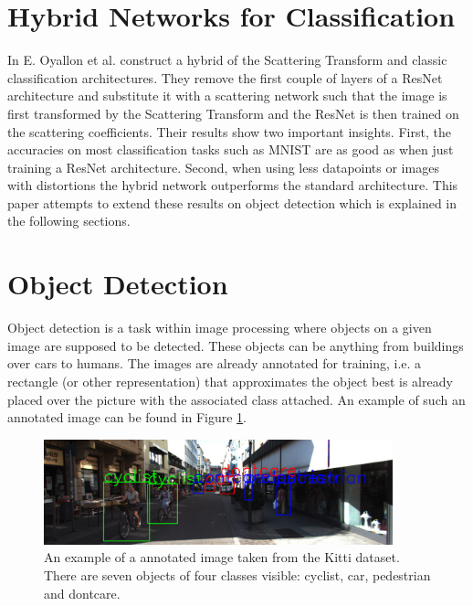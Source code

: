 \section{Hybrid Networks for Classification}
\label{section:hybrid_networks_for_classification}

In \cite{ScalingTheScatteringTransform2017} E. Oyallon et al. construct a hybrid of the Scattering Transform and classic classification architectures. They remove the first couple of layers of a ResNet \cite{ResNet15} architecture and substitute it with a scattering network such that the image is first transformed by the Scattering Transform and the ResNet is then trained on the scattering coefficients. Their results show two important insights. First, the accuracies on most classification tasks such as MNIST are as good as when just training a ResNet architecture. Second, when using less datapoints or images with distortions the hybrid network outperforms the standard architecture. This paper attempts to extend these results on object detection which is explained in the following sections. 

\section{Object Detection}
\label{sec:object_detection}

Object detection is a task within image processing where objects on a given image are supposed to be detected. These objects can be anything from buildings over cars to humans. The images are already annotated for training, i.e. a rectangle (or other representation) that approximates the object best is already placed over the picture with the associated class attached. An example of such an annotated image can be found in Figure \ref{fig:annot_example}.

\begin{figure}[!htb]
	\centering
	\includegraphics[width=0.9\textwidth]{images/Annotations_example.png}
	\caption{An example of a annotated image taken from the Kitti dataset. There are seven objects of four classes visible: cyclist, car, pedestrian and dontcare.}
	\label{fig:annot_example}
\end{figure}

